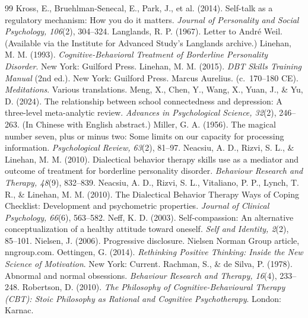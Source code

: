 \documentclass[11pt]{article}
\begin{document}
\begin{thebibliography}{99}
 Kross, E., Bruehlman-Senecal, E., Park, J., et al. (2014). Self-talk as a regulatory mechanism: How you do it matters. \emph{Journal of Personality and Social Psychology, 106}(2), 304--324.
 Langlands, R. P. (1967). Letter to Andr\'e Weil. (Available via the Institute for Advanced Study's Langlands archive.)
 Linehan, M. M. (1993). \emph{Cognitive-Behavioral Treatment of Borderline Personality Disorder}. New York: Guilford Press.
 Linehan, M. M. (2015). \emph{DBT Skills Training Manual} (2nd ed.). New York: Guilford Press.
 Marcus Aurelius. (c.~170--180 CE). \emph{Meditations}. Various translations.
 Meng, X., Chen, Y., Wang, X., Yuan, J., \& Yu, D. (2024). The relationship between school connectedness and depression: A three-level meta-analytic review. \emph{Advances in Psychological Science, 32}(2), 246--263. (In Chinese with English abstract.)
 Miller, G. A. (1956). The magical number seven, plus or minus two: Some limits on our capacity for processing information. \emph{Psychological Review, 63}(2), 81--97.
 Neacsiu, A. D., Rizvi, S. L., \& Linehan, M. M. (2010). Dialectical behavior therapy skills use as a mediator and outcome of treatment for borderline personality disorder. \emph{Behaviour Research and Therapy, 48}(9), 832--839.
 Neacsiu, A. D., Rizvi, S. L., Vitaliano, P. P., Lynch, T. R., \& Linehan, M. M. (2010). The Dialectical Behavior Therapy Ways of Coping Checklist: Development and psychometric properties. \emph{Journal of Clinical Psychology, 66}(6), 563--582.
 Neff, K. D. (2003). Self-compassion: An alternative conceptualization of a healthy attitude toward oneself. \emph{Self and Identity, 2}(2), 85--101.
 Nielsen, J. (2006). Progressive disclosure. Nielsen Norman Group article, nngroup.com.
 Oettingen, G. (2014). \emph{Rethinking Positive Thinking: Inside the New Science of Motivation}. New York: Current.
 Rachman, S., \& de Silva, P. (1978). Abnormal and normal obsessions. \emph{Behaviour Research and Therapy, 16}(4), 233--248.
 Robertson, D. (2010). \emph{The Philosophy of Cognitive-Behavioural Therapy (CBT): Stoic Philosophy as Rational and Cognitive Psychotherapy}. London: Karnac.

\end{thebibliography}
\end{document}
